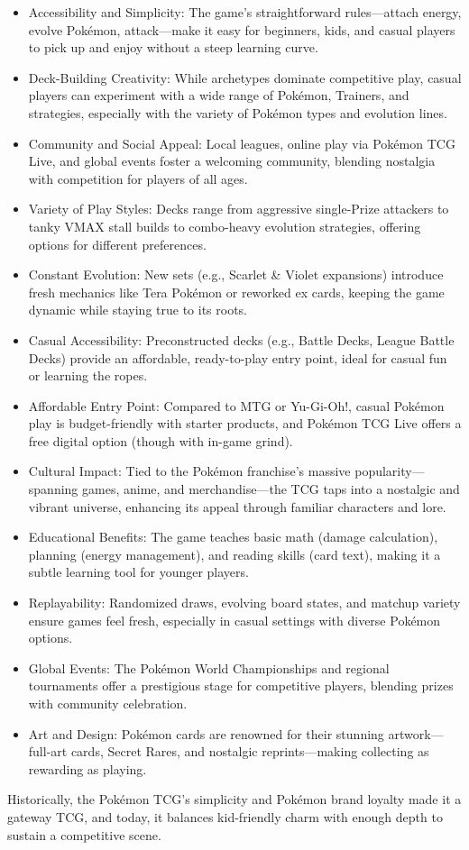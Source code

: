\begin{itemize}
\item Accessibility and Simplicity: The game’s straightforward rules—attach energy, evolve Pokémon, attack—make it easy for beginners, kids, and casual players to pick up and enjoy without a steep learning curve.
\item Deck-Building Creativity: While archetypes dominate competitive play, casual players can experiment with a wide range of Pokémon, Trainers, and strategies, especially with the variety of Pokémon types and evolution lines.
\item Community and Social Appeal: Local leagues, online play via Pokémon TCG Live, and global events foster a welcoming community, blending nostalgia with competition for players of all ages.
\item Variety of Play Styles: Decks range from aggressive single-Prize attackers to tanky VMAX stall builds to combo-heavy evolution strategies, offering options for different preferences.
\item Constant Evolution: New sets (e.g., Scarlet \& Violet expansions) introduce fresh mechanics like Tera Pokémon or reworked ex cards, keeping the game dynamic while staying true to its roots.
\item Casual Accessibility: Preconstructed decks (e.g., Battle Decks, League Battle Decks) provide an affordable, ready-to-play entry point, ideal for casual fun or learning the ropes.
\item Affordable Entry Point: Compared to MTG or Yu-Gi-Oh!, casual Pokémon play is budget-friendly with starter products, and Pokémon TCG Live offers a free digital option (though with in-game grind).
\item Cultural Impact: Tied to the Pokémon franchise’s massive popularity—spanning games, anime, and merchandise—the TCG taps into a nostalgic and vibrant universe, enhancing its appeal through familiar characters and lore.
\item Educational Benefits: The game teaches basic math (damage calculation), planning (energy management), and reading skills (card text), making it a subtle learning tool for younger players.
\item Replayability: Randomized draws, evolving board states, and matchup variety ensure games feel fresh, especially in casual settings with diverse Pokémon options.
\item Global Events: The Pokémon World Championships and regional tournaments offer a prestigious stage for competitive players, blending prizes with community celebration.
\item Art and Design: Pokémon cards are renowned for their stunning artwork—full-art cards, Secret Rares, and nostalgic reprints—making collecting as rewarding as playing.
\end{itemize}

Historically, the Pokémon TCG’s simplicity and Pokémon brand loyalty made it a gateway TCG, and today, it balances kid-friendly charm with enough depth to sustain a competitive scene.

